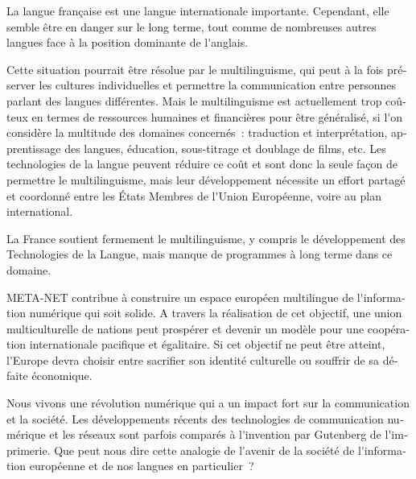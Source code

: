 \begin{french}
\begin{multicols}{2}
\begin{itemize}
\end{itemize}

La langue française est une langue internationale
importante. Cependant, elle semble être en danger sur le long terme,
tout comme de nombreuses autres langues face à la position dominante
de l{\mbox '}anglais.

Cette situation pourrait être résolue par le multilinguisme, qui peut
à la fois préserver les cultures individuelles et permettre la
communication entre personnes parlant des langues différentes. Mais le
multilinguisme est actuellement trop coûteux en termes de ressources
humaines et financières pour être généralisé, si l{\mbox '}on
considère la multitude des domaines concernés~: traduction et
interprétation, apprentissage des langues, éducation, sous-titrage et
doublage de films, etc. Les technologies de la langue peuvent
réduire ce coût et sont donc la seule façon de permettre le
multilinguisme, mais leur développement nécessite un effort partagé et
coordonné entre les États Membres de l{\mbox '}Union Européenne, voire
au plan international.

La France soutient fermement le multilinguisme, y compris le
développement des Technologies de la Langue, mais manque de programmes
à long terme dans ce domaine.

META-NET contribue à construire un espace européen multilingue de
l{\mbox '}information numérique qui soit solide. A travers la
réalisation de cet objectif, une union multiculturelle de nations peut
prospérer et devenir un modèle pour une coopération internationale
pacifique et égalitaire. Si cet objectif ne peut être atteint, l{\mbox
  '}Europe devra choisir entre sacrifier son identité culturelle ou
souffrir de sa défaite économique.

\end{multicols}

\clearpage


\begin{multicols}{2}

Nous vivons une révolution numérique qui a un impact fort
sur la communication et la société. Les développements récents des
technologies de communication numérique et les réseaux sont parfois
comparés à l{\mbox '}invention par Gutenberg de l{\mbox '}imprimerie. Que peut nous
dire cette analogie de l{\mbox '}avenir de la société de l{\mbox '}information
européenne et de nos langues en particulier~?


\end{multicols}
\end{french}
